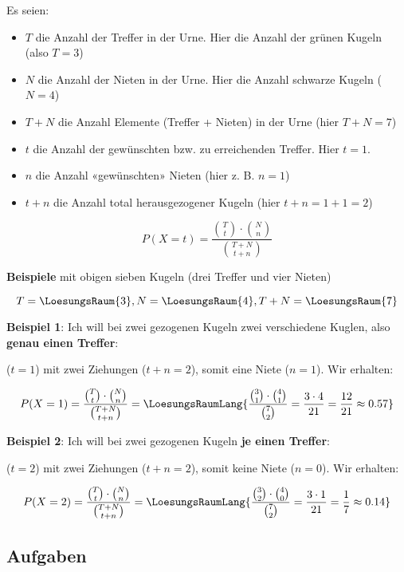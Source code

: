 Es seien:
\begin{itemize}
\item $T$ die Anzahl der Treffer in der Urne. Hier die Anzahl der grünen Kugeln (also $T = 3$)
\item $N$ die Anzahl der Nieten in der Urne. Hier die Anzahl schwarze Kugeln ($N=4$)
\item $T+N$ die Anzahl Elemente (Treffer + Nieten) in der Urne (hier $T+N = 7$)

\item $t$ die Anzahl der gewünschten bzw. zu erreichenden Treffer. Hier \zB $t=1$.
  
\item $n$ die Anzahl «gewünschten» Nieten (hier z. B. $n = 1$)
\item $t+n$ die Anzahl total herausgezogener Kugeln (hier $t+n=1+1=2$)
\end{itemize}

\newpage


\begin{gesetz}{}{}
$$P(X=t) = \frac{ {T\choose t} \cdot{} {{N}\choose {n}}}{{{T+N} \choose {t+n}}}$$
\end{gesetz}

\textbf{Beispiele} mit obigen sieben Kugeln (drei Treffer und vier
Nieten)
\leserluft

$$T=\LoesungsRaum{3}, N=\LoesungsRaum{4}, T+N=\LoesungsRaum{7}$$


\textbf{Beispiel 1}: Ich will bei zwei gezogenen Kugeln zwei
verschiedene Kuglen, also \textbf{genau einen Treffer}:

($t=1$) mit zwei Ziehungen ($t+n=2$), somit eine Niete ($n=1$).
Wir erhalten:

$$P(X=1) = \frac{ {T\choose t} \cdot{} {{N}\choose {n}}}{{{T+N}
    \choose {t+n}}} = \LoesungsRaumLang{\frac{ {3\choose 1} \cdot{} {{4}\choose {1}}}{{7
    \choose 2}} = \frac{3\cdot{4}}{21} = \frac{12}{21} \approx 0.57}$$

\textbf{Beispiel 2}: Ich will bei zwei gezogenen Kugeln \textbf{je einen Treffer}:

($t=2$) mit zwei Ziehungen ($t+n=2$), somit keine Niete ($n=0$).
Wir erhalten:

$$P(X=2) = \frac{ {T\choose t} \cdot{} {{N}\choose {n}}}{{{T+N}
    \choose {t+n}}} = \LoesungsRaumLang{\frac{ {3\choose 2} \cdot{} {{4}\choose {0}}}{{7
    \choose 2}} = \frac{3\cdot{}1}{21} = \frac17 \approx 0.14}$$


\subsection*{Aufgaben}


\newpage

